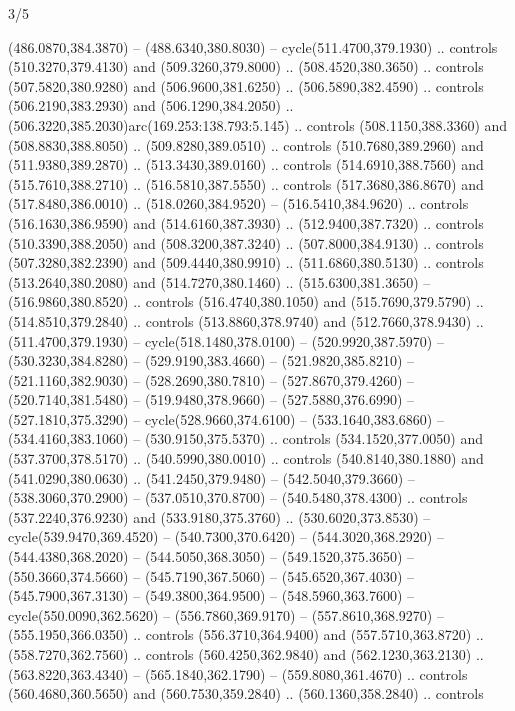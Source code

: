 \begin{flagdescription}{3/5}
\begin{scope}[xshift=0.5\flaglength,yshift=0.5\flagwidth,scale=\flagwidth/768]
\begin{scope}[y=0.80pt, x=0.80pt, yscale=-1.75, xscale=1.75,xshift=-74mm,yshift=-108mm]
\begin{scope}[shift={(-236.93803,83.83961)},fill=cc8a400]
  (486.0870,384.3870) -- (488.6340,380.8030) -- cycle(511.4700,379.1930) ..
  controls (510.3270,379.4130) and (509.3260,379.8000) .. (508.4520,380.3650) ..
  controls (507.5820,380.9280) and (506.9600,381.6250) .. (506.5890,382.4590) ..
  controls (506.2190,383.2930) and (506.1290,384.2050) ..
  (506.3220,385.2030)arc(169.253:138.793:5.145) .. controls (508.1150,388.3360)
  and (508.8830,388.8050) .. (509.8280,389.0510) .. controls (510.7680,389.2960)
  and (511.9380,389.2870) .. (513.3430,389.0160) .. controls (514.6910,388.7560)
  and (515.7610,388.2710) .. (516.5810,387.5550) .. controls (517.3680,386.8670)
  and (517.8480,386.0010) .. (518.0260,384.9520) -- (516.5410,384.9620) ..
  controls (516.1630,386.9590) and (514.6160,387.3930) .. (512.9400,387.7320) ..
  controls (510.3390,388.2050) and (508.3200,387.3240) .. (507.8000,384.9130) ..
  controls (507.3280,382.2390) and (509.4440,380.9910) .. (511.6860,380.5130) ..
  controls (513.2640,380.2080) and (514.7270,380.1460) .. (515.6300,381.3650) --
  (516.9860,380.8520) .. controls (516.4740,380.1050) and (515.7690,379.5790) ..
  (514.8510,379.2840) .. controls (513.8860,378.9740) and (512.7660,378.9430) ..
  (511.4700,379.1930) -- cycle(518.1480,378.0100) -- (520.9920,387.5970) --
  (530.3230,384.8280) -- (529.9190,383.4660) -- (521.9820,385.8210) --
  (521.1160,382.9030) -- (528.2690,380.7810) -- (527.8670,379.4260) --
  (520.7140,381.5480) -- (519.9480,378.9660) -- (527.5880,376.6990) --
  (527.1810,375.3290) -- cycle(528.9660,374.6100) -- (533.1640,383.6860) --
  (534.4160,383.1060) -- (530.9150,375.5370) .. controls (534.1520,377.0050) and
  (537.3700,378.5170) .. (540.5990,380.0010) .. controls (540.8140,380.1880) and
  (541.0290,380.0630) .. (541.2450,379.9480) -- (542.5040,379.3660) --
  (538.3060,370.2900) -- (537.0510,370.8700) -- (540.5480,378.4300) .. controls
  (537.2240,376.9230) and (533.9180,375.3760) .. (530.6020,373.8530) --
  cycle(539.9470,369.4520) -- (540.7300,370.6420) -- (544.3020,368.2920) --
  (544.4380,368.2020) -- (544.5050,368.3050) -- (549.1520,375.3650) --
  (550.3660,374.5660) -- (545.7190,367.5060) -- (545.6520,367.4030) --
  (545.7900,367.3130) -- (549.3800,364.9500) -- (548.5960,363.7600) --
  cycle(550.0090,362.5620) -- (556.7860,369.9170) -- (557.8610,368.9270) --
  (555.1950,366.0350) .. controls (556.3710,364.9400) and (557.5710,363.8720) ..
  (558.7270,362.7560) .. controls (560.4250,362.9840) and (562.1230,363.2130) ..
  (563.8220,363.4340) -- (565.1840,362.1790) -- (559.8080,361.4670) .. controls
  (560.4680,360.5650) and (560.7530,359.2840) .. (560.1360,358.2840) .. controls

\end{scope}
\end{scope}
\end{scope}
\end{flagdescription}
